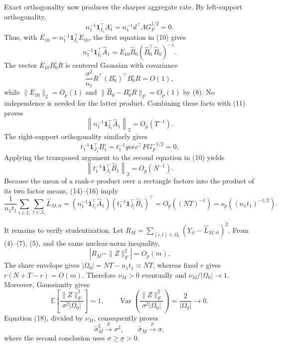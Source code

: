 Exact orthogonality now produces the sharper aggregate rate.  By left-support orthogonality,
\[
 n_1^{-1}\mathbf 1_{I_1}^{\top}A^\circ_1
 =n_1^{-1}d^{\top}\Lambda G_F^{1/2}=0.
\tag{12}
\]
Thus, with \(\overline E_{10}=n_1^{-1}\mathbf 1_{I_1}^{\top}E_{10}\), the first equation in (10) gives
\[
 n_1^{-1}\mathbf 1_{I_1}^{\top}\widehat A_1
 =\overline E_{10}\widehat B_0(\widehat B_0^{\top}\widehat B_0)^{-1}.
\tag{13}
\]
The vector \(\overline E_{10}B^\circ_0R\) is centered Gaussian with covariance
\[
 \frac{\sigma^2}{n_1}R^{\top}(B^\circ_0)^{\top}B^\circ_0R=O(1),
\]
while \(\|\overline E_{10}\|_2=O_p(1)\) and \(\|\widehat B_0-B^\circ_0R\|_F=O_p(1)\) by (8).  No independence is needed for the latter product.  Combining these facts with (11) proves
\[
 \left\|n_1^{-1}\mathbf 1_{I_1}^{\top}\widehat A_1\right\|_2=O_p(T^{-1}).
\tag{14}
\]
The right-support orthogonality similarly gives
\[
 t_1^{-1}\mathbf 1_{J_1}^{\top}B^\circ_1
 =t_1^{-1}qvec^{\top}F G_F^{-1/2}=0.
\tag{15}
\]
Applying the transposed argument to the second equation in (10) yields
\[
 \left\|t_1^{-1}\mathbf 1_{J_1}^{\top}\widehat B_1\right\|_2=O_p(N^{-1}).
\tag{16}
\]
Because the mean of a rank-\(r\) product over a rectangle factors into the product of its two factor means, (14)--(16) imply
\[
 \frac1{n_1t_1}\sum_{i\in I_1}\sum_{t\in J_1}\widehat L_{M,it}
 =\left(n_1^{-1}\mathbf 1_{I_1}^{\top}\widehat A_1\right)
   \left(t_1^{-1}\mathbf 1_{J_1}^{\top}\widehat B_1\right)^{\top}
 =O_p((NT)^{-1})
 =o_p((n_1t_1)^{-1/2}).
\tag{17}
\]

It remains to verify studentization.  Let \(R_M=\sum_{(i,t)\in\Omega_0}(Y_{it}-\widehat L_{M,it})^2\).  From (4)--(7), (5), and the same nuclear-norm inequality,
\[
 |R_M-\|Z\|_F^2|=O_p(m).
\tag{18}
\]
The share envelope gives \(|\Omega_0|=NT-n_1t_1\asymp NT\), whereas fixed \(r\) gives \(r(N+T-r)=O(m)\).  Therefore \(\nu_M>0\) eventually and \(\nu_M/|\Omega_0|\to1\).  Moreover, Gaussianity gives
\[
 \mathbb E\!\left[\frac{\|Z\|_F^2}{\sigma^2|\Omega_0|}\right]=1,
 \qquad
 \operatorname{Var}\!\left(\frac{\|Z\|_F^2}{\sigma^2|\Omega_0|}\right)=\frac2{|\Omega_0|}\to0.
\]
Equation (18), divided by \(\nu_M\), consequently proves
\[
 \widehat\sigma_M^2\xrightarrow{p}\sigma^2,
 \qquad
 \widehat\sigma_M\xrightarrow{p}\sigma,
\tag{19}
\]
where the second conclusion uses \(\sigma\geq\underline\sigma>0\).

